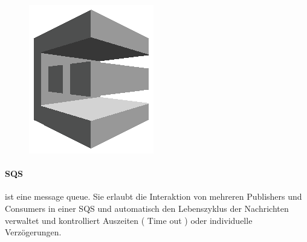 \documentclass[
12pt,
english,
ngerman,
headsepline,
twoside,
openright,
numbers=noenddot,version=first
]{scrreprt}
\begin{document}
\begin{figure}
	\includegraphics[width=0.9\linewidth]{./pics/aws/Messaging_GRAYSCALE_AmazonSQS.eps}
\end{figure}
\paragraph{\acrfull{SQS}}\label{par:sqs} ist eine message queue. Sie erlaubt die Interaktion von mehreren Publishers und Consumers in einer \acrshort{SQS} und automatisch den Lebenszyklus der Nachrichten verwaltet und kontrolliert Auszeiten ( Time out ) oder individuelle Verzögerungen.
\end{document}
